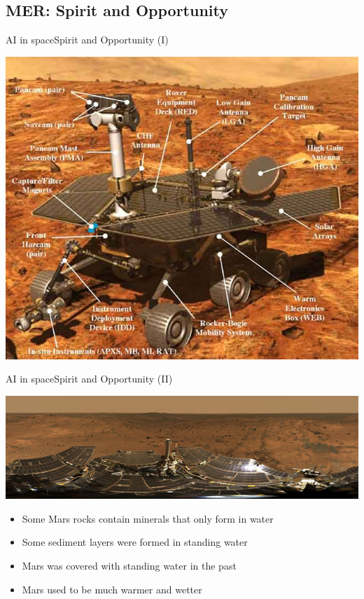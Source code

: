 \documentclass[10pt,compress]{beamer} %
\begin{document}
{	\subsection{MER: Spirit and Opportunity}
	\begin{frame}{AI in space}{Spirit and Opportunity (I)}
		\begin{center}
			\includegraphics[width=0.6\linewidth]{figs/rover_detail_large.jpg}
		\end{center}
	\end{frame}

	\begin{frame}{AI in space}{Spirit and Opportunity (II)}
		\begin{center}
			\includegraphics[width=0.9\linewidth]{figs/opportunity.jpg}
		\end{center}

		\vspace{-0.2cm}

		\begin{itemize}
			\item Some Mars rocks contain minerals that only form in water
			\item Some sediment layers were formed in standing water
			\item Mars was covered with standing water in the past
			\item Mars used to be much warmer and wetter
		\end{itemize}
	\end{frame}

}
\end{document}
